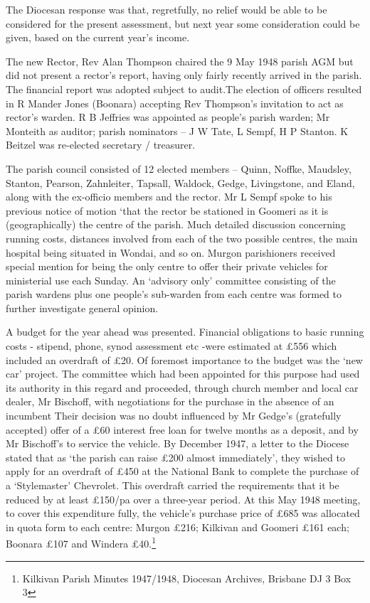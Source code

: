 The Diocesan response was that, regretfully, no relief would be able to be considered for the present assessment, but next year some consideration could be given, based on the current year's income.

The new Rector, Rev Alan Thompson chaired the 9 May 1948 parish AGM but did not present a rector's report, having only fairly recently arrived in the parish. The financial report was adopted subject to audit.The election of officers resulted in R Mander Jones (Boonara) accepting Rev Thompson's invitation to act as rector's warden. R B Jeffries was appointed as people's parish warden; Mr Monteith as auditor; parish nominators -- J W Tate, L Sempf, H P Stanton. K Beitzel was re-elected secretary / treasurer.

The parish council consisted of 12 elected members -- Quinn, Noffke, Maudsley, Stanton, Pearson, Zahnleiter, Tapsall, Waldock, Gedge, Livingstone, and Eland, along with the ex-officio members and the rector. Mr L Sempf spoke to his previous notice of motion `that the rector be stationed in Goomeri as it is (geographically) the centre of the parish. Much detailed discussion concerning running costs, distances involved from each of the two possible centres, the main hospital being situated in Wondai, and so on. Murgon parishioners received special mention for being the only centre to offer their private vehicles for ministerial use each Sunday. An `advisory only' committee consisting of the parish wardens plus one people's sub-warden from each centre was formed to further investigate general opinion.

A budget for the year ahead was presented. Financial obligations to basic running costs - stipend, phone, synod assessment etc -were estimated at £556 which included an overdraft of £20. Of foremost importance to the budget was the `new car' project. The committee which had been appointed for this purpose had used its authority in this regard and proceeded, through church member and local car dealer, Mr Bischoff, with negotiations for the purchase in the absence of an incumbent Their decision was no doubt influenced by Mr Gedge's (gratefully accepted) offer of a £60 interest free loan for twelve months as a deposit, and by Mr Bischoff's to service the vehicle. By December 1947, a letter to the Diocese stated that as `the parish can raise £200 almost immediately', they wished to apply for an overdraft of £450 at the National Bank to complete the purchase of a `Stylemaster' Chevrolet. This overdraft carried the requirements that it be reduced by at least £150/pa over a three-year period. At this May 1948 meeting, to cover this expenditure fully, the vehicle's purchase price of £685 was allocated in quota form to each centre: Murgon £216; Kilkivan and Goomeri £161 each; Boonara £107 and Windera £40.\footnote{Kilkivan Parish Minutes 1947/1948, Diocesan Archives, Brisbane DJ 3 Box 3}

